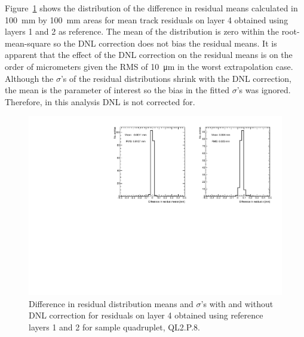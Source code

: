 Figure~\ref{fig:dnl_compare_fits} shows the distribution of the difference in residual means calculated in \SI{100}{mm} by \SI{100}{mm} areas for mean track residuals on layer 4 obtained using layers 1 and 2 as reference. The mean of the distribution is zero within the root-mean-square so the DNL correction does not bias the residual means. It is apparent that the effect of the DNL correction on the residual means is on the order of micrometers given the RMS of \SI{10}{\micro\meter} in the worst extrapolation case. Although the $\sigma$'s of the residual distributions shrink with the DNL correction, the mean is the parameter of interest so the bias in the fitted $\sigma$'s was ignored. Therefore, in this analysis DNL is not corrected for. 

\begin{figure}
    \centering
    \includegraphics[width = \textwidth]{figures/figure_compare_residual_fits_QL2P08_3100V_2021-06-18_no_dnl_minus_QL2P08_3100V_2021-06-18_2_50um_universal_DNL_layer4_fixedlayers12.pdf}
    \caption{Difference in residual distribution means and $\sigma$'s with and without DNL correction for residuals on layer 4 obtained using reference layers 1 and 2 for sample quadruplet, QL2.P.8.}
    \label{fig:dnl_compare_fits}
\end{figure}